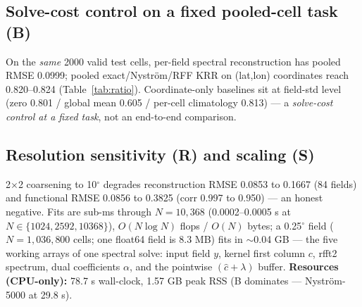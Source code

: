 \documentclass{article}
\begin{document}
\subsection{Solve-cost control on a fixed pooled-cell task (B)}
\label{sec:b}
On the \emph{same} 2000 valid test cells, per-field spectral reconstruction
has pooled RMSE 0.0999; pooled exact/Nystr\"om/RFF KRR on (lat,lon)
coordinates reach 0.820--0.824 (Table~\ref{tab:ratio}). Coordinate-only
baselines sit at field-std level (zero 0.801 / global mean 0.605 / per-cell
climatology 0.813) --- a \emph{solve-cost control at a fixed task}, not an
end-to-end comparison.

\subsection{Resolution sensitivity (R) and scaling (S)}
2$\times$2 coarsening to 10$^\circ$ degrades reconstruction RMSE 0.0853 to
0.1667 (84 fields) and functional RMSE 0.0856 to 0.3825 (corr 0.997 to 0.950)
--- an honest negative. Fits are sub-ms through $N{=}10{,}368$
(0.0002--0.0005 s at $N{\in}\{1024,2592,10368\}$), $O(N\log N)$ flops /
$O(N)$ bytes; a 0.25$^\circ$ field ($N{=}1{,}036{,}800$ cells; one float64
field is 8.3 MB) fits in $\sim$0.04 GB --- the five working arrays of one
spectral solve: input field $y$, kernel first column $c$, rfft2 spectrum,
dual coefficients $\alpha$, and the pointwise $(\hat{c}{+}\lambda)$ buffer.
\textbf{Resources (CPU-only):} 78.7 s wall-clock, 1.57 GB peak RSS
(B dominates --- Nystr\"om-5000 at 29.8 s).
\end{document}
